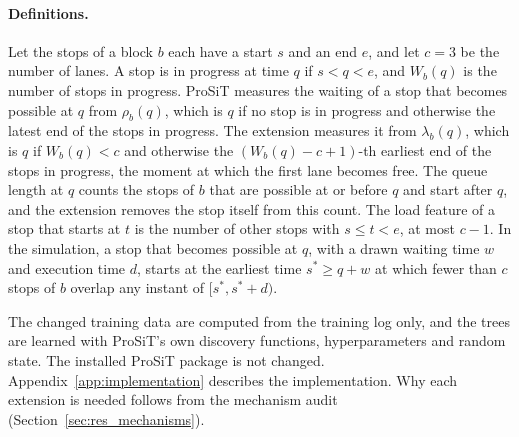 \paragraph{Definitions.} Let the stops of a block $b$ each have a start $s$ and an
end $e$, and let $c=3$ be the number of lanes. A stop is in progress at time $q$ if
$s<q<e$, and $W_b(q)$ is the number of stops in progress. ProSiT measures the waiting
of a stop that becomes possible at $q$ from $\rho_b(q)$, which is $q$ if no stop is in
progress and otherwise the latest end of the stops in progress. The extension
measures it from $\lambda_b(q)$, which is $q$ if $W_b(q)<c$ and otherwise the
$(W_b(q)-c+1)$-th earliest end of the stops in progress, the moment at which the
first lane becomes free. The queue length at $q$ counts the stops of $b$ that are
possible at or before $q$ and start after $q$, and the extension removes the stop
itself from this count. The load feature of a stop that starts at $t$ is the number
of other stops with $s\le t<e$, at most $c-1$. In the simulation, a stop that becomes
possible at $q$, with a drawn waiting time $w$ and execution time $d$, starts at the
earliest time $s^{*}\ge q+w$ at which fewer than $c$ stops of $b$ overlap any instant
of $[s^{*},s^{*}+d)$.

The changed training data are computed from the training log only, and the trees
are learned with ProSiT's own discovery functions, hyperparameters and random
state. The installed ProSiT package is not changed. Appendix~\ref{app:implementation}
describes the implementation. Why each extension is needed follows from the
mechanism audit (Section~\ref{sec:res_mechanisms}).

